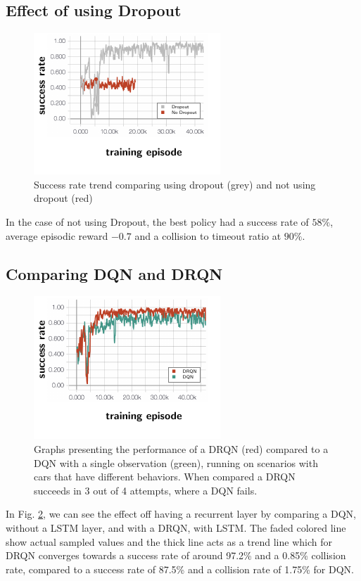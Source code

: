 \subsection{Effect of using Dropout}
\begin{figure}[!ht]
	\centering
	\includegraphics[width=0.7\columnwidth]{figures/figures-dropout.pdf}
	\vspace{-0.5cm}
	\caption{Success rate trend comparing using dropout (grey) and not using dropout (red)}
	\label{fig:results_dropout}
\end{figure}
In the case of not using Dropout, the best policy had a success rate of $58\%$, average episodic reward $-0.7$ and a collision to timeout ratio at $90 \%$. 


\subsection{Comparing DQN and DRQN}
\begin{figure}[!ht]
	\centering
	\includegraphics[width=0.7\columnwidth]{figures/figures-recurrent.pdf}
	\vspace{-0.5cm}
	\caption{Graphs presenting the performance of a DRQN (red) compared to a DQN with a single observation (green), running on scenarios with cars that have different behaviors. When compared a DRQN succeeds in 3 out of 4 attempts, where a DQN fails.}
	\label{fig:results_recurremt}
\end{figure}
In Fig. \ref{fig:results_recurremt}, we can see the effect off having a recurrent layer by comparing a DQN, without a LSTM layer, and  with a DRQN, with LSTM.
The faded colored line show actual sampled values and the thick line acts as a trend line which for DRQN converges towards a success rate of around 97.2\% and a 0.85\% collision rate, compared to a success rate of 87.5\% and a collision rate of 1.75\% for DQN. 


